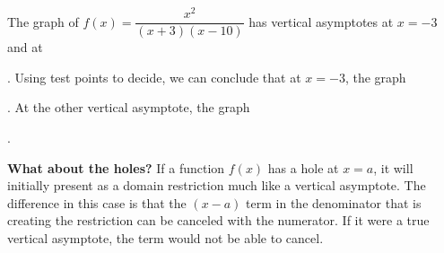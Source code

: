 \documentclass{ximera}
\begin{document}
\begin{example}
The graph of $f(x)=\dfrac{x^2}{(x+3)(x-10)}$ has vertical asymptotes at $x=-3$ and at 
  \begin{multipleChoice}
  \end{multipleChoice}. Using test points to decide, we can conclude that at $x=-3$, the graph 
  \begin{multipleChoice}
  \end{multipleChoice}. At the other vertical asymptote, the graph 
  \begin{multipleChoice}
  \end{multipleChoice}. 
\end{example}

\textbf{What about the holes?} If a function $f(x)$ has a hole at $x=a$, it will initially present as a domain restriction much like a vertical asymptote. The difference in this case is that the $(x-a)$ term in the denominator that is creating the restriction can be canceled with the numerator. If it were a true vertical asymptote, the term would not be able to cancel.
\end{document}
